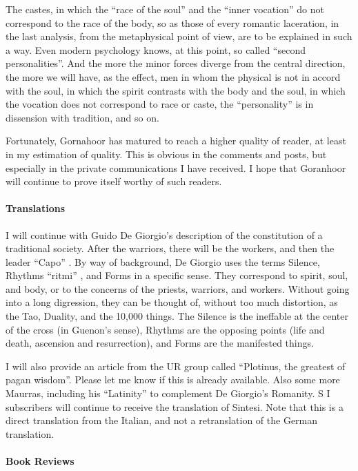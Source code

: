 \begin{quotex}
The castes, in which the ``race of the soul'' and the ``inner vocation'' do not correspond to the race of the body, so as those of every romantic laceration, in the last analysis, from the metaphysical point of view, are to be explained in such a way. Even modern psychology knows, at this point, so called ``second personalities''. And the more the minor forces diverge from the central direction, the more we will have, as the effect, men in whom the physical is not in accord with the soul, in which the spirit contrasts with the body and the soul, in which the vocation does not correspond to race or caste, the ``personality'' is in dissension with tradition, and so on.
\end{quotex}


Fortunately, Gornahoor has matured to reach a higher quality of reader, at least in my estimation of quality. This is obvious in the comments and posts, but especially in the private communications I have received. I hope that Goranhoor will continue to prove itself worthy of such readers.

\paragraph{Translations}


I will continue with Guido De Giorgio's description of the constitution of a traditional society. After the warriors, there will be the workers, and then the leader ``Capo'' . By way of background, De Giorgio uses the terms Silence, Rhythms ``ritmi'' , and Forms in a specific sense. They correspond to spirit, soul, and body, or to the concerns of the priests, warriors, and workers. Without going into a long digression, they can be thought of, without too much distortion, as the Tao, Duality, and the 10,000 things. The Silence is the ineffable at the center of the cross (in Guenon's sense), Rhythms are the opposing points (life and death, ascension and resurrection), and Forms are the manifested things.

I will also provide an article from the UR group called ``Plotinus, the greatest of pagan wisdom''. Please let me know if this is already available. Also some more Maurras, including his ``Latinity'' to complement De Giorgio's Romanity. S I subscribers will continue to receive the translation of Sintesi. Note that this is a direct translation from the Italian, and not a retranslation of the German translation.

\paragraph{Book Reviews}


